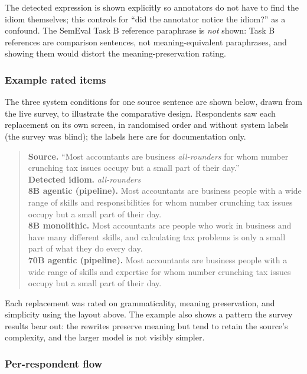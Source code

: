 The detected expression is shown explicitly so annotators do not have to find the idiom themselves; this controls for ``did the annotator notice the idiom?'' as a confound. The SemEval Task B reference paraphrase is \textit{not} shown: Task B references are comparison sentences, not meaning-equivalent paraphrases, and showing them would distort the meaning-preservation rating.

\subsubsection{Example rated items}

The three system conditions for one source sentence are shown below, drawn from the live survey, to illustrate the comparative design. Respondents saw each replacement on its own screen, in randomised order and without system labels (the survey was blind); the labels here are for documentation only.

\begin{quote}
\textbf{Source.} ``Most accountants are business \textit{all-rounders} for whom number crunching tax issues occupy but a small part of their day.''\\
\textbf{Detected idiom.} \textit{all-rounders}\\[4pt]
\textbf{8B agentic (pipeline).} Most accountants are business people with a wide range of skills and responsibilities for whom number crunching tax issues occupy but a small part of their day.\\[2pt]
\textbf{8B monolithic.} Most accountants are people who work in business and have many different skills, and calculating tax problems is only a small part of what they do every day.\\[2pt]
\textbf{70B agentic (pipeline).} Most accountants are business people with a wide range of skills and expertise for whom number crunching tax issues occupy but a small part of their day.
\end{quote}

Each replacement was rated on grammaticality, meaning preservation, and simplicity using the layout above. The example also shows a pattern the survey results bear out: the rewrites preserve meaning but tend to retain the source's complexity, and the larger model is not visibly simpler.

\subsubsection{Per-respondent flow}

